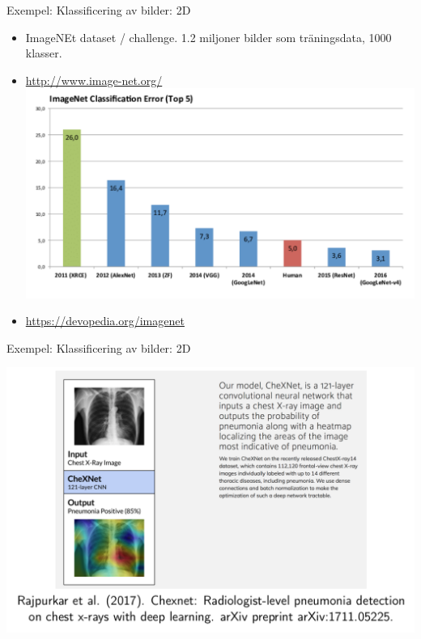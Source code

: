 \documentclass[10pt,english]{beamer}
\begin{document}
\begin{frame}{Exempel: Klassificering av bilder: 2D}

    \begin{itemize}
        \item ImageNEt dataset / challenge. 1.2 miljoner bilder som träningsdata, 1000 klasser.
        \item \url{http://www.image-net.org/}
        \includegraphics[width = .8\textwidth]{figs/imageNet.png}
        \item \url{https://devopedia.org/imagenet}
    \end{itemize}
    
\end{frame}

\begin{frame}{Exempel: Klassificering av bilder: 2D}

    \includegraphics[width = \textwidth]{figs/Chexnet.png}
    
\end{frame}
\end{document}
